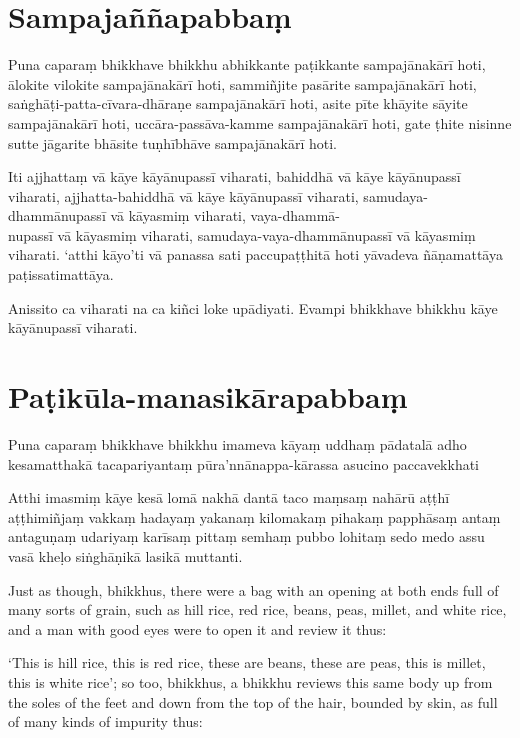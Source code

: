 \paliPage
\section*{Sampajaññapabbaṃ}

Puna caparaṃ bhikkhave bhikkhu abhikkante paṭikkante sampajānakārī hoti, ālokite
vilokite sampajānakārī hoti, sammiñjite pasārite sampajānakārī hoti,
saṅghāṭi-patta-cīvara-dhāraṇe sampajānakārī hoti, asite pīte khāyite sāyite
sampajānakārī hoti, uccāra-passāva-kamme sampajānakārī hoti, gate ṭhite nisinne
sutte jāgarite bhāsite tuṇhībhāve sampajānakārī hoti.

Iti ajjhattaṃ vā kāye kāyānupassī viharati, bahiddhā vā kāye kāyānupassī
viharati, ajjhatta-bahiddhā vā kāye kāyānupassī viharati, samudaya-dhammānupassī
vā kāyasmiṃ viharati, vaya-dhammā-\\
nupassī vā kāyasmiṃ viharati, samudaya-vaya-dhammānupassī vā kāyasmiṃ viharati.
`atthi kāyo'ti vā panassa sati paccupaṭṭhitā hoti yāvadeva ñāṇamattāya
paṭissatimattāya.

Anissito ca viharati na ca kiñci loke upādiyati. Evampi bhikkhave bhikkhu kāye
kāyānupassī viharati.


\section*{Paṭikūla-manasikārapabbaṃ}

Puna caparaṃ bhikkhave bhikkhu imameva kāyaṃ uddhaṃ pādatalā adho kesamatthakā
tacapariyantaṃ pūra'nnānappa-kārassa asucino paccavekkhati

Atthi imasmiṃ kāye kesā lomā nakhā dantā taco maṃsaṃ nahārū aṭṭhī aṭṭhimiñjaṃ
vakkaṃ hadayaṃ yakanaṃ kilomakaṃ pihakaṃ papphāsaṃ antaṃ antaguṇaṃ udariyaṃ
karīsaṃ pittaṃ semhaṃ pubbo lohitaṃ sedo medo assu vasā kheḷo siṅghāṇikā lasikā
muttanti.

\englishPage

Just as though, bhikkhus, there were a bag with an opening at both ends full of
many sorts of grain, such as hill rice, red rice, beans, peas, millet, and white
rice, and a man with good eyes were to open it and review it thus:

‘This is hill rice, this is red rice, these are beans, these are peas, this is
millet, this is white rice’; so too, bhikkhus, a bhikkhu reviews this same body
up from the soles of the feet and down from the top of the hair, bounded by
skin, as full of many kinds of impurity thus:


